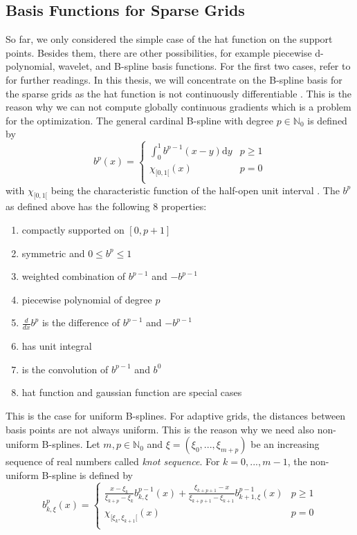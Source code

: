 \subsection{Basis Functions for Sparse Grids}

So far, we only considered the simple case of the hat function on the support points. Besides them, there are other possibilities, for example piecewise d-polynomial, wavelet, and B-spline basis functions. For the first two cases, refer to \cite{pfluger2010spatially, bungartz1998finite, bungartz2004sparse} for further readings. In this thesis, we will concentrate on the B-spline basis for the sparse grids as the hat function is not continuously differentiable \cite{b_splines}. This is the reason why we can not compute globally continuous gradients which is a problem for the optimization. The general cardinal B-spline with degree $ p \in \mathbb{N}_0 $ is defined by 
\begin{equation}
	b^p(x) = \begin{cases} 
				\int_0^1 b^{p-1}(x-y) \text{d}y				& p \geq 1 \\
				\chi_{[0,1[}(x) 							& p=0 \\
			\end{cases}
\end{equation}
with $ \chi_{[0,1[} $ being the characteristic function of the half-open unit interval \cite{hollig2013approximation}. The $ b^p $ as defined above has the following 8 properties:

\begin{enumerate}
	\item compactly supported on $ [0, p+1] $
	\item symmetric and $ 0 \le b^p \le 1 $
	\item weighted combination of $ b^{p-1} $ and $ -b^{p-1} $
	\item piecewise polynomial of degree $ p $
	\item $ \frac{d}{dx} b^p $ is the difference of $ b^{p-1} $ and $ -b^{p-1} $
	\item has unit integral 
	\item is the convolution of $ b^{p-1} $ and $ b^{0} $
	\item hat function and gaussian function are special cases
\end{enumerate}

This is the case for uniform B-splines. For adaptive grids, the distances between basis points are not always uniform. This is the reason why we need also non-uniform B-splines. Let $ m, p \in \mathbb{N}_0 $ and $ \xi = (\xi_0, ... , \xi_{m+p}) $ be an increasing sequence of real numbers called \textit{knot sequence}. For $ k=0,..., m-1 $, the non-uniform B-spline is defined by 
\begin{equation}
	b^p_{k,\xi}(x) = \begin{cases} 
		\frac{x-\xi_k}{\xi_{k+p}-\xi_k}b^{p-1}_{k,\xi}(x) + \frac{\xi_{k+p+1}-x}{\xi_{k+p+1}-\xi_{k+1}}b^{p-1}_{k+1,\xi}(x)				& p \geq 1 \\
		\chi_{[\xi_{k},\xi_{k+1}[}(x) 							& p=0 \\
	\end{cases}
\end{equation}

